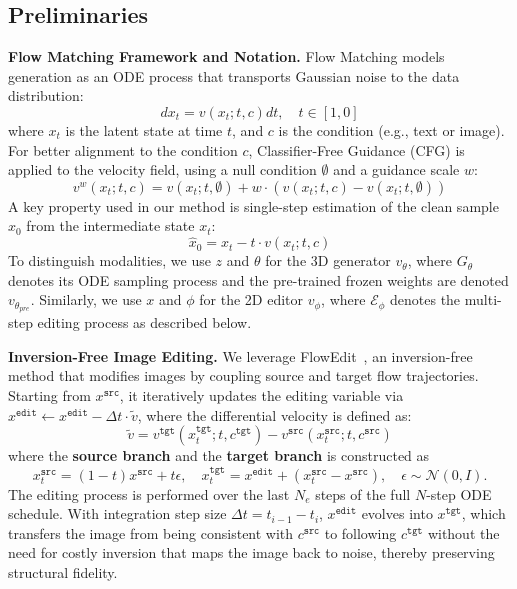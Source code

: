 \documentclass[runningheads]{llncs}
\begin{document}
\subsection{Preliminaries}
\label{sec:preliminaries}
\textbf{Flow Matching Framework and Notation.}
Flow Matching models generation as an ODE process that transports Gaussian noise to the data distribution:
\begin{equation}
    dx_t = v(x_t; t, c) dt, \quad t \in [1, 0]
\end{equation}
where $x_t$ is the latent state at time $t$, and $c$ is the condition (e.g., text or image).
For better alignment to the condition $c$, Classifier-Free Guidance (CFG) is applied to the velocity field, using a null condition $\emptyset$ and a guidance scale $w$:
\begin{equation}
    \label{eq:cfg_guidance}
    v^{w}(x_t; t, c) = v(x_t; t, \emptyset) + w \cdot (v(x_t; t, c) - v(x_t; t, \emptyset))
\end{equation}
A key property used in our method is single-step estimation of the clean sample $\hat{x}_0$ from the intermediate state $x_t$:
\begin{equation}
    \label{eq:single_step_estimation}
    \hat{x}_0 = x_t - t \cdot v(x_t; t, c)
\end{equation}
To distinguish modalities, we use $z$ and $\theta$ for the 3D generator $v_\theta$, where $G_\theta$ denotes its ODE sampling process and the pre-trained frozen weights are denoted $v_{\theta_{pre}}$.
Similarly, we use $x$ and $\phi$ for the 2D editor $v_\phi$, where $\mathcal{E}_\phi$ denotes the multi-step editing process as described below.



\textbf{Inversion-Free Image Editing.}
We leverage FlowEdit~\cite{couairon2024flowedit}, an inversion-free method that modifies images by coupling source and target flow trajectories.
Starting from $x^{\texttt{src}}$, it iteratively updates the editing variable via $x^{\texttt{edit}} \leftarrow x^{\texttt{edit}} - \Delta t \cdot \tilde{v}$, where the differential velocity is defined as:
\begin{equation}
    \label{eq:flowedit_transition}
    \tilde{v} = v^{\texttt{tgt}}(x_t^{\texttt{tgt}}; t, c^{\texttt{tgt}}) - v^{\texttt{src}}(x_t^{\texttt{src}}; t, c^{\texttt{src}})
\end{equation}
where the \textbf{source branch} and the \textbf{target branch} is constructed as
\begin{equation}
    \label{eq:flowedit_states}
    x_t^{\texttt{src}} = (1-t)x^{\texttt{src}} + t\epsilon, \quad x_t^{\texttt{tgt}} = x^{\texttt{edit}} + (x_t^{\texttt{src}} - x^{\texttt{src}}), \quad \epsilon \sim \mathcal{N}(0, I).
\end{equation}
The editing process is performed over the last $N_e$ steps of the full $N$-step ODE schedule.
With integration step size $\Delta t = t_{i-1} - t_i$, $x^{\texttt{edit}}$ evolves into $x^{\texttt{tgt}}$, which transfers the image from being consistent with $c^{\texttt{src}}$ to following $c^{\texttt{tgt}}$ without the need for costly inversion that maps the image back to noise, thereby preserving structural fidelity.
\end{document}
